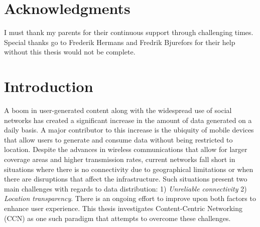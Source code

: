 \documentclass[a4paper,12pt]{report}      %
\begin{document}
\pagebreak
\chapter*{}

\pagebreak
\chapter*{Acknowledgments}

I must thank my parents for their continuous support through challenging times. Special thanks go to Frederik Hermans and Fredrik Bjurefors for their help without this thesis would not be complete.

\bigskip\bigskip


\tableofcontents

\pagebreak
\chapter*{}

\pagebreak
\chapter{Introduction}
A boom in user-generated content along with the widespread use of social networks has created a significant increase in the amount of data generated on a daily basis. A major contributor to this increase is the ubiquity of mobile devices that allow users to generate and consume data without being restricted to location. Despite the advances in wireless communications that allow for larger coverage areas and higher transmission rates, current networks fall short in situations where there is no connectivity due to geographical limitations or when there are disruptions that affect the infrastructure. Such situations present two main challenges with regards to data distribution: 1) \emph{Unreliable connectivity} 2) \emph{Location transparency}. There is an ongoing effort to improve upon both factors to enhance user experience. This thesis investigates Content-Centric Networking (CCN) as one such paradigm that
attempts to overcome these challenges.
\end{document}

